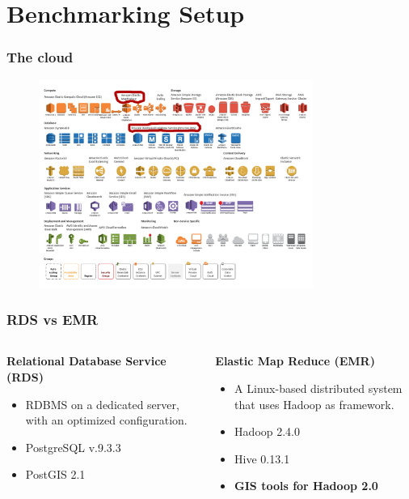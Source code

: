 \documentclass[hyperref={pdfpagelabels=true}]{beamer}
\begin{document}
\section{Benchmarking Setup} 
\begin{frame}
\frametitle{The cloud}
    \begin{figure}       
	\includegraphics[width=0.8\textwidth]{cloud_aws1.png}      
     \end{figure}      
\end{frame}

\begin{frame}
\frametitle{RDS vs EMR}
\begin{columns}
  \begin{column}{0.5\textwidth}
   \textbf{Relational Database Service (RDS)}
   \begin{itemize}
    \item<2->RDBMS on a dedicated server, with an optimized configuration.
    \item<3->PostgreSQL v.9.3.3
    \item<3->PostGIS 2.1
    \end{itemize}
  \end{column}
  
  \begin{column}{0.5\textwidth}
  \textbf{Elastic Map Reduce (EMR)}
   \begin{itemize}
    \item<2->A Linux-based distributed system that uses Hadoop as framework.
    \item<3->Hadoop 2.4.0
    \item<3->Hive 0.13.1
    \item<3->\textbf{GIS tools for Hadoop 2.0}
    \end{itemize}  
  \end{column}  
\end{columns}
\end{frame}
\end{document}
